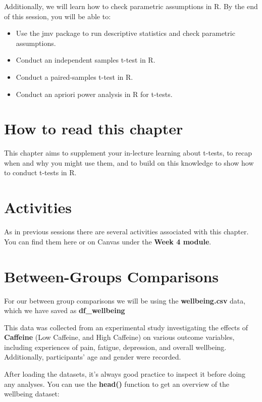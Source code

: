 \documentclass[
]{book}
\begin{document}
Additionally, we will learn how to check parametric assumptions in R. By the end of this session, you will be able to:

\begin{itemize}
\item
  Use the jmv package to run descriptive statistics and check parametric assumptions.
\item
  Conduct an independent samples t-test in R.
\item
  Conduct a paired-samples t-test in R.
\item
  Conduct an apriori power analysis in R for t-tests.
\end{itemize}

\section{How to read this chapter}\label{how-to-read-this-chapter-2}

This chapter aims to supplement your in-lecture learning about t-tests, to recap when and why you might use them, and to build on this knowledge to show how to conduct t-tests in R.

\section{Activities}\label{activities-2}

As in previous sessions there are several activities associated with this chapter. You can find them here or on Canvas under the \textbf{Week 4 module}.

\section{Between-Groups Comparisons}\label{between-groups-comparisons}

For our between group comparisons we will be using the \textbf{wellbeing.csv} data, which we have saved as \textbf{df\_wellbeing}

This data was collected from an experimental study investigating the effects of \textbf{Caffeine} (Low Caffeine, and High Caffeine) on various outcome variables, including experiences of pain, fatigue, depression, and overall wellbeing. Additionally, participants' age and gender were recorded.

After loading the datasets, it's always good practice to inspect it before doing any analyses. You can use the \textbf{head()} function to get an overview of the wellbeing dataset:
\end{document}
